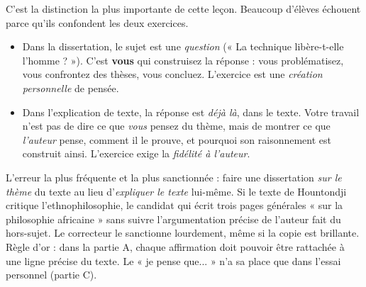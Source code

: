\documentclass[11pt]{article}
\newcommand{\cle}[1]{{\popxbold\color{popdark}#1}}
\begin{document}
C'est la distinction la plus importante de cette leçon. Beaucoup d'élèves échouent parce qu'ils confondent les deux exercices.

\begin{itemize}
\item Dans la \cle{dissertation}, le sujet est une \emph{question} (« La technique libère-t-elle l'homme ? »). C'est \textbf{vous} qui construisez la réponse : vous problématisez, vous confrontez des thèses, vous concluez. L'exercice est une \emph{création personnelle} de pensée.
\item Dans l'\cle{explication de texte}, la réponse est \emph{déjà là}, dans le texte. Votre travail n'est pas de dire ce que \emph{vous} pensez du thème, mais de montrer ce que \emph{l'auteur} pense, comment il le prouve, et pourquoi son raisonnement est construit ainsi. L'exercice exige la \emph{fidélité à l'auteur}.
\end{itemize}

\begin{attention}
L'erreur la plus fréquente et la plus sanctionnée : faire une dissertation \emph{sur le thème} du texte au lieu d'\emph{expliquer le texte} lui-même. Si le texte de Hountondji critique l'ethnophilosophie, le candidat qui écrit trois pages générales « sur la philosophie africaine » sans suivre l'argumentation précise de l'auteur fait du hors-sujet. Le correcteur le sanctionne lourdement, même si la copie est brillante. Règle d'or : dans la partie A, chaque affirmation doit pouvoir être rattachée à une ligne précise du texte. Le « je pense que... » n'a sa place que dans l'essai personnel (partie C).
\end{attention}
\end{document}
